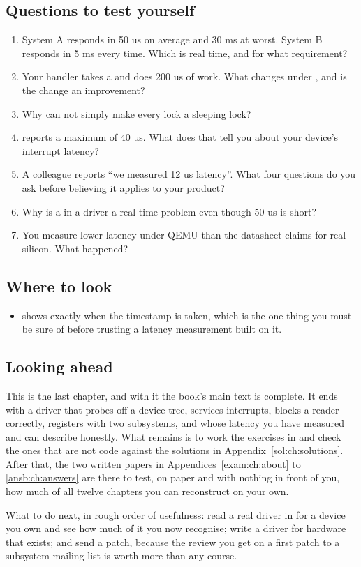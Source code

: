 \subsection*{Questions to test yourself}
\begin{enumerate}
  \item System A responds in 50 us on average and 30 ms at worst. System B responds in 5 ms every
    time. Which is real time, and for what requirement?
  \item Your handler takes a  and does 200 us of work. What changes under
    , and is the change an improvement?
  \item Why can  not simply make every lock a sleeping lock?
  \item {} reports a maximum of 40 us. What does that tell you about your device's
    interrupt latency?
  \item A colleague reports ``we measured 12 us latency''. What four questions do you ask before
    believing it applies to your product?
  \item Why is a  in a driver a real-time problem even though 50 us is short?
  \item You measure lower latency under QEMU than the datasheet claims for real silicon. What
    happened?
\end{enumerate}

\subsection*{Where to look}
\begin{itemize}
  \item {} shows exactly when the timestamp is taken, which is the one
    thing you must be sure of before trusting a latency measurement built on it.
\end{itemize}

\subsection*{Looking ahead}
This is the last chapter, and with it the book's main text is complete. It ends with a driver that
probes off a device tree, services interrupts, blocks a reader correctly, registers with two
subsystems, and whose latency you have measured and can describe honestly. What remains is to work
the exercises in  and check the ones that are not code against the
solutions in Appendix~\ref{sol:ch:solutions}. After that, the two written papers in
Appendices~\ref{exam:ch:about} to \ref{ansb:ch:answers} are there to test, on paper and with nothing
in front of you, how much of all twelve chapters you can reconstruct on your own.

What to do next, in rough order of usefulness: read a real driver in  for a device
you own and see how much of it you now recognise; write a driver for hardware that exists; and send
a patch, because the review you get on a first patch to a subsystem mailing list is worth more than
any course.
